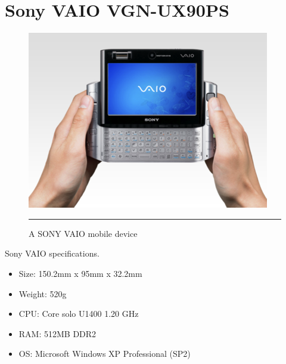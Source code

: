 \chapter{Sony VAIO VGN-UX90PS}
\label{AppendixA}

\begin{figure}[htbp]
  \centering
    \includegraphics{./Primitives/vaio.png}
    \rule{35em}{0.5pt}
  \caption[A SONY VAIO mobile device]{A SONY VAIO mobile device}
\end{figure}

Sony VAIO specifications.

\begin{itemize}
\item Size: 150.2mm x 95mm x 32.2mm
\item Weight: 520g
\item CPU: Core solo U1400 1.20 GHz
\item RAM: 512MB DDR2
\item OS: Microsoft Windows XP Professional (SP2)
\end{itemize}
